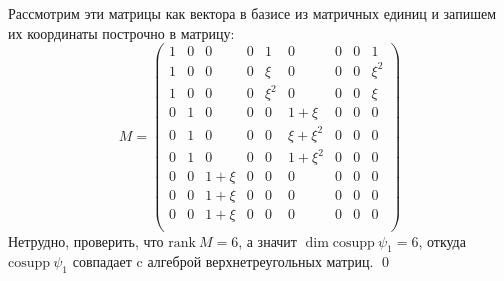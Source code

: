 \documentclass[12pt, reqno, a4paper, oneside, notitlepage]{amsart}
\makeatletter
\theoremstyle{mytheoremstyle}
\theoremstyle{myremarkstyle}
\numberwithin{equation}{section}
\renewenvironment{proof}[1][\proofname]{\par\indent {\bfseries #1\@addpunct{.} }}{\qed}
\makeatother
\begin{document}
\begin{proof}
    Рассмотрим эти матрицы как вектора в базисе из матричных единиц и запишем их координаты построчно в матрицу: \[ M=
    \begin{pmatrix}
        1 & 0 & 0 & 0 & 1 & 0 & 0 & 0 & 1\\
        1 & 0 & 0 & 0 & \xi & 0 & 0 & 0 & \xi^2\\
        1 & 0 & 0 & 0 & \xi^2 & 0 & 0 & 0 & \xi\\
        0 & 1 & 0 & 0 & 0 & 1+\xi & 0 & 0 & 0\\
        0 & 1 & 0 & 0 & 0 & \xi+\xi^2 & 0 & 0 & 0\\
        0 & 1 & 0 & 0 & 0 & 1+\xi^2 & 0 & 0 & 0\\
        0 & 0 & 1+\xi & 0 & 0 & 0 & 0 & 0 & 0\\
        0 & 0 & 1+\xi & 0 & 0 & 0 & 0 & 0 & 0\\
        0 & 0 & 1+\xi & 0 & 0 & 0 & 0 & 0 & 0\\
    \end{pmatrix}
    \]
    Нетрудно, проверить, что $\mathrm{rank}\ M = 6$, а значит $\dim \mathrm{cosupp} \ \psi_1 = 6$, откуда $\mathrm{cosupp}\ \psi_1$ совпадает c алгеброй верхнетреугольных матриц.
\end{proof}
\end{document}
